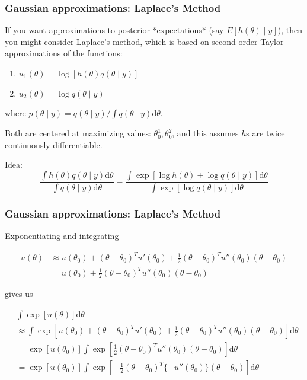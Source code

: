 \documentclass{beamer}
\begin{document}
\begin{frame}[fragile]
\frametitle{Gaussian approximations: Laplace's Method}

If you want approximations to posterior *expectations* (say $E[h(\theta) \mid y]$), then you might consider Laplace's method, which is based on second-order Taylor approximations of the functions:
\begin{enumerate}
\item $u_1(\theta) = \log[h(\theta)q(\theta \mid y)]$
\item $u_2(\theta) = \log q(\theta \mid y)$
\end{enumerate}
where $p(\theta \mid y) = q(\theta \mid y) / \int q(\theta \mid y)\text{d}\theta$. 
\newline

Both are centered at maximizing values: $\theta_0^1, \theta_0^2$, and this assumes $h$s are twice continuously differentiable.
\newline

Idea:
$$
\frac{\int h(\theta)q(\theta \mid y) \text{d}\theta}{\int q(\theta \mid y) \text{d}\theta } = \frac{\int \exp\left[ \log h(\theta) + \log q(\theta \mid y) \right] \text{d}\theta}{ \int \exp\left[ \log q(\theta \mid y) \right] \text{d}\theta }
$$


\end{frame}


\begin{frame}[fragile]
\frametitle{Gaussian approximations: Laplace's Method}

Exponentiating and integrating

\begin{align*}
u(\theta) &\approx u(\theta_0) + (\theta - \theta_0)^Tu'(\theta_0) + \frac{1}{2}(\theta - \theta_0)^T u''(\theta_0)(\theta - \theta_0) \\
&= u(\theta_0) + \frac{1}{2}(\theta - \theta_0)^T u''(\theta_0)(\theta - \theta_0)
\end{align*}

gives us

\begin{align*}
&\int \exp[ u(\theta) ] \text{d}\theta \\
&\approx \int \exp[ u(\theta_0) + (\theta - \theta_0)^Tu'(\theta_0) + \frac{1}{2}(\theta - \theta_0)^T u''(\theta_0)(\theta - \theta_0) ] \text{d}\theta \\
&= \exp [u(\theta_0)] \int \exp\left[\frac{1}{2}(\theta - \theta_0)^T u''(\theta_0)(\theta - \theta_0) \right] \text{d}\theta \\
&= \exp [u(\theta_0)] \int \exp\left[-\frac{1}{2}(\theta - \theta_0)^T \{-u''(\theta_0)\}(\theta - \theta_0) \right] \text{d}\theta
\end{align*}


\end{frame}
\end{document}
